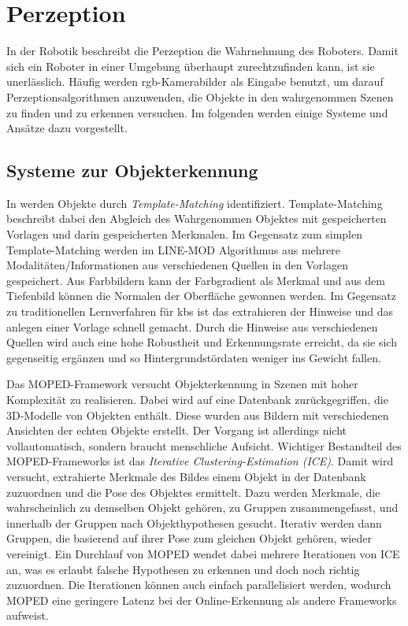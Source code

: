 \section{Perzeption}
In der Robotik beschreibt die Perzeption die Wahrnehmung des Roboters. Damit sich ein Roboter in einer Umgebung überhaupt zurechtzufinden kann, ist sie unerlässlich. Häufig werden \gls{rgb}-Kamerabilder als Eingabe benutzt, um darauf Perzeptionsalgorithmen anzuwenden, die Objekte in den wahrgenommen Szenen zu finden und zu erkennen versuchen. Im folgenden werden einige Systeme und Ansätze dazu vorgestellt.

\subsection{Systeme zur Objekterkennung}

In \cite{multimodalTemplate} werden Objekte durch \textit{Template-Matching} identifiziert. Template-Matching beschreibt dabei den Abgleich des Wahrgenommen Objektes mit gespeicherten Vorlagen und darin gespeicherten Merkmalen. Im Gegensatz zum simplen Template-Matching werden im LINE-MOD Algorithmus aus \cite{multimodalTemplate} mehrere Modalitäten/Informationen aus verschiedenen Quellen in den Vorlagen gespeichert. Aus Farbbildern kann der Farbgradient als Merkmal und aus dem Tiefenbild können die Normalen der Oberfläche gewonnen werden. Im Gegensatz zu traditionellen Lernverfahren für \glspl{kb} ist das extrahieren der Hinweise und das anlegen einer Vorlage schnell gemacht. Durch die Hinweise aus verschiedenen Quellen wird auch eine hohe Robustheit und Erkennungsrate erreicht, da sie sich gegenseitig ergänzen und so Hintergrundstördaten weniger ins Gewicht fallen. \par

Das MOPED-Framework \cite{moped} versucht Objekterkennung in Szenen mit hoher Komplexität zu realisieren. Dabei wird auf eine Datenbank zurückgegriffen, die 3D-Modelle von Objekten enthält. Diese wurden aus Bildern mit verschiedenen Ansichten der echten Objekte erstellt. Der Vorgang ist allerdings nicht vollautomatisch, sondern braucht menschliche Aufsicht. Wichtiger Bestandteil des MOPED-Frameworks ist das \textit{Iterative Clustering-Estimation (ICE)}. Damit wird versucht, extrahierte Merkmale des Bildes einem Objekt in der Datenbank zuzuordnen und die Pose des Objektes ermittelt. Dazu werden Merkmale, die wahrscheinlich zu demselben Objekt gehören, zu Gruppen zusammengefasst, und innerhalb der Gruppen nach Objekthypothesen gesucht. Iterativ werden dann Gruppen, die basierend auf ihrer Pose zum gleichen Objekt gehören, wieder vereinigt. Ein Durchlauf von MOPED wendet dabei mehrere Iterationen von ICE an, was es erlaubt falsche Hypothesen zu erkennen und doch noch richtig zuzuordnen. Die Iterationen können auch einfach parallelisiert werden, wodurch MOPED eine geringere Latenz bei der Online-Erkennung als andere Frameworks aufweist.  \par

